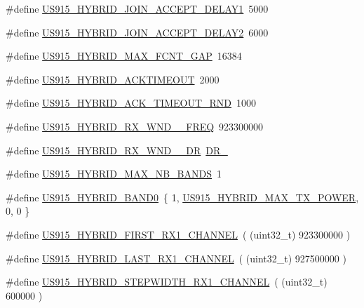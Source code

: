 \begin{DoxyCompactItemize}
\item 
\#define \hyperlink{group__REGIONUS915HYB_ga4c1ae5c7dd6fb04bb0275959d38e3bb6}{U\+S915\+\_\+\+H\+Y\+B\+R\+I\+D\+\_\+\+J\+O\+I\+N\+\_\+\+A\+C\+C\+E\+P\+T\+\_\+\+D\+E\+L\+A\+Y1}~5000
\item 
\#define \hyperlink{group__REGIONUS915HYB_ga8860ee877a8a686915e64f7ec6180c4a}{U\+S915\+\_\+\+H\+Y\+B\+R\+I\+D\+\_\+\+J\+O\+I\+N\+\_\+\+A\+C\+C\+E\+P\+T\+\_\+\+D\+E\+L\+A\+Y2}~6000
\item 
\#define \hyperlink{group__REGIONUS915HYB_ga905c03a9bea32e6d9afb2117f209dec5}{U\+S915\+\_\+\+H\+Y\+B\+R\+I\+D\+\_\+\+M\+A\+X\+\_\+\+F\+C\+N\+T\+\_\+\+G\+AP}~16384
\item 
\#define \hyperlink{group__REGIONUS915HYB_ga208cfcf431c114e3095c20552f5c0e77}{U\+S915\+\_\+\+H\+Y\+B\+R\+I\+D\+\_\+\+A\+C\+K\+T\+I\+M\+E\+O\+UT}~2000
\item 
\#define \hyperlink{group__REGIONUS915HYB_ga559607e0b707cb0266b55efa2eb38a79}{U\+S915\+\_\+\+H\+Y\+B\+R\+I\+D\+\_\+\+A\+C\+K\+\_\+\+T\+I\+M\+E\+O\+U\+T\+\_\+\+R\+ND}~1000
\item 
\#define \hyperlink{group__REGIONUS915HYB_gae0b62d21f2751fe9c548352e251b41dc}{U\+S915\+\_\+\+H\+Y\+B\+R\+I\+D\+\_\+\+R\+X\+\_\+\+W\+N\+D\+\_\+\_\+\+F\+R\+EQ}~923300000
\item 
\#define \hyperlink{group__REGIONUS915HYB_ga6149ce49b92f289c275a6c6844c38d46}{U\+S915\+\_\+\+H\+Y\+B\+R\+I\+D\+\_\+\+R\+X\+\_\+\+W\+N\+D\+\_\+\_\+\+DR}~\hyperlink{group__REGION_ga44cc96ba80ae464cd9330b784d329c16}{D\+R\+\_}
\item 
\#define \hyperlink{group__REGIONUS915HYB_ga1ddb8622d642ac6254b04f9020ccfcf7}{U\+S915\+\_\+\+H\+Y\+B\+R\+I\+D\+\_\+\+M\+A\+X\+\_\+\+N\+B\+\_\+\+B\+A\+N\+DS}~1
\item 
\#define \hyperlink{group__REGIONUS915HYB_gaf373565fbcca15762d7f9209e78daa6c}{U\+S915\+\_\+\+H\+Y\+B\+R\+I\+D\+\_\+\+B\+A\+N\+D0}~\{ 1, \hyperlink{group__REGIONUS915HYB_ga94a1ed1e5cca1f05f0ac4916e164f529}{U\+S915\+\_\+\+H\+Y\+B\+R\+I\+D\+\_\+\+M\+A\+X\+\_\+\+T\+X\+\_\+\+P\+O\+W\+ER}, 0,  0 \}
\item 
\#define \hyperlink{group__REGIONUS915HYB_ga28e4aa61b58960f8cf317c0d891204f8}{U\+S915\+\_\+\+H\+Y\+B\+R\+I\+D\+\_\+\+F\+I\+R\+S\+T\+\_\+\+R\+X1\+\_\+\+C\+H\+A\+N\+N\+EL}~( (uint32\+\_\+t) 923300000 )
\item 
\#define \hyperlink{group__REGIONUS915HYB_ga27ad9f504f6efe05c69bc1c41cf4ae28}{U\+S915\+\_\+\+H\+Y\+B\+R\+I\+D\+\_\+\+L\+A\+S\+T\+\_\+\+R\+X1\+\_\+\+C\+H\+A\+N\+N\+EL}~( (uint32\+\_\+t) 927500000 )
\item 
\#define \hyperlink{group__REGIONUS915HYB_ga1b77da2ffd6ac645137695b2bccdff08}{U\+S915\+\_\+\+H\+Y\+B\+R\+I\+D\+\_\+\+S\+T\+E\+P\+W\+I\+D\+T\+H\+\_\+\+R\+X1\+\_\+\+C\+H\+A\+N\+N\+EL}~( (uint32\+\_\+t) 600000 )
\end{DoxyCompactItemize}
